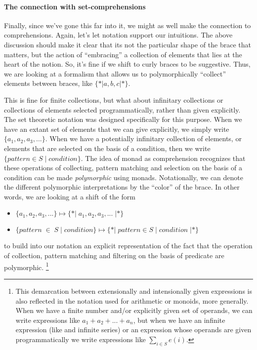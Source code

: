 \paragraph{The connection with set-comprehensions}
Finally, since we've gone this far into it, we might as well make the
connection to comprehensions. Again, let's let notation support our
intuitions. The above discussion should make it clear that its not the
particular shape of the brace that matters, but the action of
``embracing'' a collection of elements that lies at the heart of the
notion. So, it's fine if we shift to curly braces to be
suggestive. Thus, we are looking at a formalism that allows us to
polymorphically ``collect'' elements between braces, like $\{*| a, b, c |*\}$.

This is fine for finite collections, but what about infinitary
collections or collections of elements selected programmatically,
rather than given explicitly. The set theoretic notation was designed
specifically for this purpose. When we have an extant set of elements
that we can give explicitly, we simply write $\{ a_1, a_2, a_3, ... \}$.
When we have a potentially infinitary collection of elements, or
elements that are selected on the basis of a condition, then we write
$\{ pattern \in S \; | \; condition \}$. The idea of monad as comprehension
recognizes that these operations of collecting, pattern matching and
selection on the basis of a condition can be made \emph{polymorphic}
using monads. Notationally, we can denote the different polymorphic
interpretations by the ``color'' of the brace. In other words, we are
looking at a shift of the form
\begin{itemize}
  \item $\{ a_1, a_2, a_3, ... \} \mapsto \{*| \; a_1, a_2, a_3, ... \; |*\}$
  \item $\{ pattern \; \in \; S \;|\; condition \} \mapsto \{*| \; pattern \in S \; | \; condition \; |*\}$
\end{itemize}
to build into our notation an explicit representation of the fact that
the operation of collection, pattern matching and filtering on the
basis of predicate are polymorphic. \footnote{ This demarcation
  between extensionally and intensionally given expressions is also
  reflected in the notation used for arithmetic or monoids, more
  generally. When we have a finite number and/or explicitly given set
  of operands, we can write expressions like $a_1 + a_2 + ... + a_n$,
  but when we have an infinite expression (like and infinite series)
  or an expression whose operands are given programmatically we write
  expressions like $\displaystyle\sum\limits_{i \in S}^{} e( i )$. }

